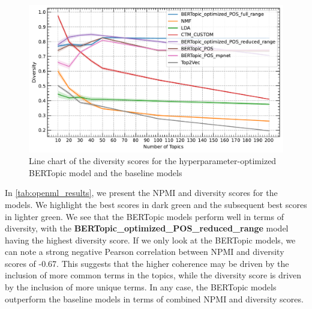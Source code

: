 \begin{figure}[h]
    \centering
    \includegraphics[width=1.0\textwidth]{figures/openml_diversity.pdf}
    \caption{Line chart of the diversity scores for the hyperparameter-optimized BERTopic model and the baseline models}
    \label{fig:openml_diversity}
\end{figure}

In \cref{tab:openml_results}, we present the NPMI and diversity scores for the models. We highlight the best scores in dark green and the subsequent best scores in lighter green. We see that the BERTopic models perform well in terms of diversity, with the \textbf{BERTopic\_optimized\_POS\_reduced\_range} model having the highest diversity score. If we only look at the BERTopic models, we can note a strong negative Pearson correlation between NPMI and diversity scores of -0.67. This suggests that the higher coherence may be driven by the inclusion of more common terms in the topics, while the diversity score is driven by the inclusion of more unique terms. In any case, the BERTopic models outperform the baseline models in terms of combined NPMI and diversity scores.

